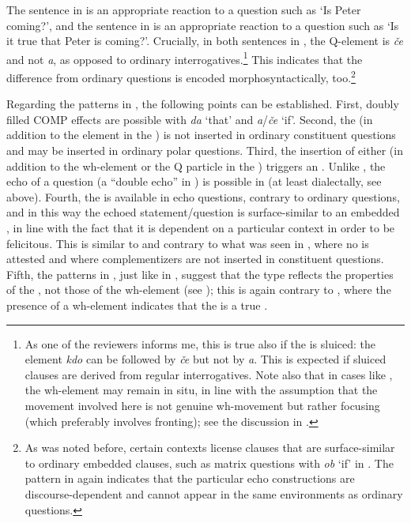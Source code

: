 \documentclass[output=paper,modfonts, hidelinks, newtxmath]{langscibook}
\begin{document}
\largerpage[-1]
\noindent The sentence in  is an appropriate reaction to a question such as `Is Peter coming?', and the sentence in  is an appropriate reaction to a question such as `Is it true that Peter is coming?'. Crucially, in both sentences in , the Q-element is \textit{če} and not \textit{a}, as opposed to ordinary  interrogatives.\footnote{As one of the reviewers informs me, this is true also if the  is sluiced: the element \textit{kdo} can be followed by \textit{če} but not by \textit{a}. This is expected if sluiced clauses are derived from regular interrogatives. Note also that in cases like , the wh-element may remain in situ, in line with the assumption that the movement involved here is not genuine wh-movement but rather focusing (which preferably involves fronting); see the discussion in .} This indicates that the difference from ordinary questions is encoded morphosyntactically, too.\footnote{As was noted before, certain contexts license clauses that are surface-similar to ordinary embedded clauses, such as matrix questions with \textit{ob} `if' in . The pattern in  again indicates that the particular echo constructions are discourse-dependent and cannot appear in the same environments as ordinary  questions.}

Regarding the  patterns in , the following points can be established. First, doubly filled COMP effects are possible with \textit{da} `that' and \textit{a}/\textit{če} `if'. Second, the  (in addition to the element in the ) is not inserted in ordinary constituent questions and may be inserted in ordinary polar questions. Third, the insertion of either  (in addition to the wh-element or the Q particle in the ) triggers an . Unlike , the echo of a question (a ``double echo'' in \citealt{hladnik2010}) is possible in  (at least dialectally, see  above). Fourth, the  is available in  echo questions, contrary to ordinary  questions, and in this way the echoed statement/question is surface-similar to an embedded , in line with the fact that it is dependent on a particular context in order to be felicitous. This is similar to  and contrary to what was seen in , where no  is attested and where complementizers are not inserted in  constituent questions. Fifth, the patterns in , just like in , suggest that the  type reflects the properties of the , not those of the wh-element (see ); this is again contrary to , where the presence of a wh-element indicates that the  is a true .
\end{document}
